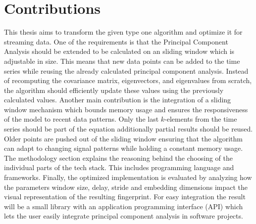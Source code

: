 \section{Contributions}
This thesis aims to transform the given type one algorithm and optimize it for streaming data. One of the requirements is that the Principal Component Analysis should be extended to be calculated on an sliding window which is adjustable in size. This means that new data points can be added to the time series while reusing the already calculated principal component analysis. Instead of recomputing the covariance matrix, eigenvectors, and eigenvalues from scratch, the algorithm should efficiently update these values using the previously calculated values. Another main contribution is the integration of a sliding window mechanism which bounds memory usage and ensures the responsiveness of the model to recent data patterns. Only the last $k$-elements from the time series should be part of the equation additionally partial results should be reused. Older points are pushed out of the sliding window ensuring that the algorithm can adapt to changing signal patterns while holding a constant memory usage. \\
The methodology section explains the reasoning behind the choosing of the individual parts of the tech stack. This includes programming language and frameworks. Finally, the optimized implementation is evaluated by analyzing how the parameters window size, delay, stride and embedding dimensions impact the visual representation of the resulting fingerprint. For easy integration the result will be a small library with an application programming interface (API) which lets the user easily integrate principal component analysis in  software projects.
